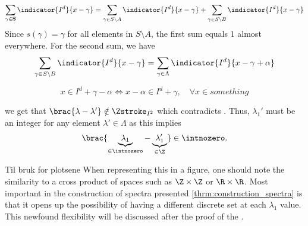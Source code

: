 \begin{align*}
    \sum_{\gamma \in \mathbf{S}} \indicator{I^d}{x-\gamma} = \sum_{\gamma \in S\setminus A} \indicator{I^d}{x-\gamma} +\sum_{\gamma \in S\setminus B} \indicator{I^d}{x-\gamma}
\end{align*}
Since $s(\gamma) = \gamma$ for all elements in $S\setminus A$, the first sum equals $1$ almost everywhere. For the second sum, we have
\begin{align*}
    \sum_{\gamma \in S\setminus B} \indicator{I^d}{x-\gamma} = \sum_{\gamma \in \Lambda} \indicator{I^d}{x-\gamma + \alpha}
\end{align*}

\begin{equation*}
    x\in I^d + \gamma - \alpha \Longleftrightarrow x-\alpha \in I^d + \gamma,  \quad \forall x\in something
\end{equation*}




we get that $\brac{\lambda-\lambda'} \notin \Zstroke_{I^2}$ which contradicts . Thus, $\lambda_1'$ must be an integer for any element $\lambda'\in \Lambda$ as this implies
\begin{align*}  %
    \brac{\underbrace{\lambda_1}_{\in \intnozero}-\underbrace{\lambda_1'}_{\in \Z}} \in \intnozero. %
\end{align*}




Til bruk for plotsene
When representing this in a figure, one should note the similarity to a cross product of spaces such as $\Z \times \Z$ or $\R \times \R$. Most important in the construction of spectra presented \cref{thrm:construction_spectra} is that it opens up the possibility of having a different discrete set at each $\lambda_1$ value. This newfound flexibility will be discussed after the proof of the .



